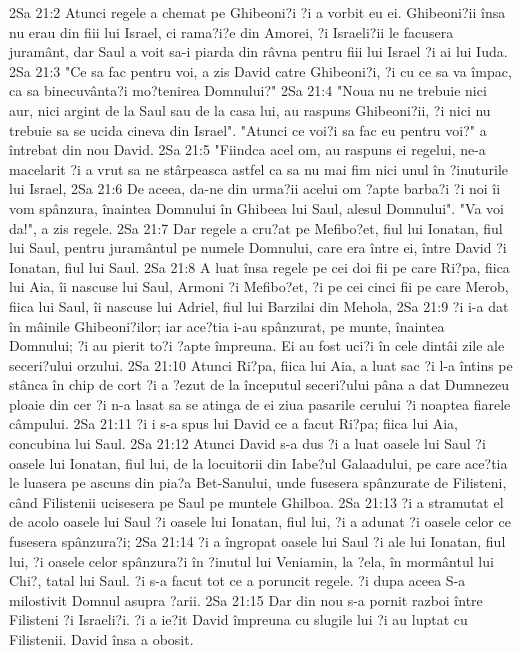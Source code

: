 2Sa 21:2  Atunci regele a chemat pe Ghibeoni?i ?i a vorbit eu ei. Ghibeoni?ii însa nu erau din fiii lui Israel, ci rama?i?e din Amorei, ?i Israeli?ii le facusera juramânt, dar Saul a voit sa-i piarda din râvna pentru fiii lui Israel ?i ai lui Iuda.
2Sa 21:3  "Ce sa fac pentru voi, a zis David catre Ghibeoni?i, ?i cu ce sa va împac, ca sa binecuvânta?i mo?tenirea Domnului?"
2Sa 21:4  "Noua nu ne trebuie nici aur, nici argint de la Saul sau de la casa lui, au raspuns Ghibeoni?ii, ?i nici nu trebuie sa se ucida cineva din Israel". "Atunci ce voi?i sa fac eu pentru voi?" a întrebat din nou David.
2Sa 21:5  "Fiindca acel om, au raspuns ei regelui, ne-a macelarit ?i a vrut sa ne stârpeasca astfel ca sa nu mai fim nici unul în ?inuturile lui Israel,
2Sa 21:6  De aceea, da-ne din urma?ii acelui om ?apte barba?i ?i noi îi vom spânzura, înaintea Domnului în Ghibeea lui Saul, alesul Domnului". "Va voi da!", a zis regele.
2Sa 21:7  Dar regele a cru?at pe Mefibo?et, fiul lui Ionatan, fiul lui Saul, pentru juramântul pe numele Domnului, care era între ei, între David ?i Ionatan, fiul lui Saul.
2Sa 21:8  A luat însa regele pe cei doi fii pe care Ri?pa, fiica lui Aia, îi nascuse lui Saul, Armoni ?i Mefibo?et, ?i pe cei cinci fii pe care Merob, fiica lui Saul, îi nascuse lui Adriel, fiul lui Barzilai din Mehola,
2Sa 21:9  ?i i-a dat în mâinile Ghibeoni?ilor; iar ace?tia i-au spânzurat, pe munte, înaintea Domnului; ?i au pierit to?i ?apte împreuna. Ei au fost uci?i în cele dintâi zile ale seceri?ului orzului.
2Sa 21:10  Atunci Ri?pa, fiica lui Aia, a luat sac ?i l-a întins pe stânca în chip de cort ?i a ?ezut de la începutul seceri?ului pâna a dat Dumnezeu ploaie din cer ?i n-a lasat sa se atinga de ei ziua pasarile cerului ?i noaptea fiarele câmpului.
2Sa 21:11  ?i i s-a spus lui David ce a facut Ri?pa; fiica lui Aia, concubina lui Saul.
2Sa 21:12  Atunci David s-a dus ?i a luat oasele lui Saul ?i oasele lui Ionatan, fiul lui, de la locuitorii din Iabe?ul Galaadului, pe care ace?tia le luasera pe ascuns din pia?a Bet-Sanului, unde fusesera spânzurate de Filisteni, când Filistenii ucisesera pe Saul pe muntele Ghilboa.
2Sa 21:13  ?i a stramutat el de acolo oasele lui Saul ?i oasele lui Ionatan, fiul lui, ?i a adunat ?i oasele celor ce fusesera spânzura?i;
2Sa 21:14  ?i a îngropat oasele lui Saul ?i ale lui Ionatan, fiul lui, ?i oasele celor spânzura?i în ?inutul lui Veniamin, la ?ela, în mormântul lui Chi?, tatal lui Saul. ?i s-a facut tot ce a poruncit regele. ?i dupa aceea S-a milostivit Domnul asupra ?arii.
2Sa 21:15  Dar din nou s-a pornit razboi între Filisteni ?i Israeli?i. ?i a ie?it David împreuna cu slugile lui ?i au luptat cu Filistenii. David însa a obosit.
